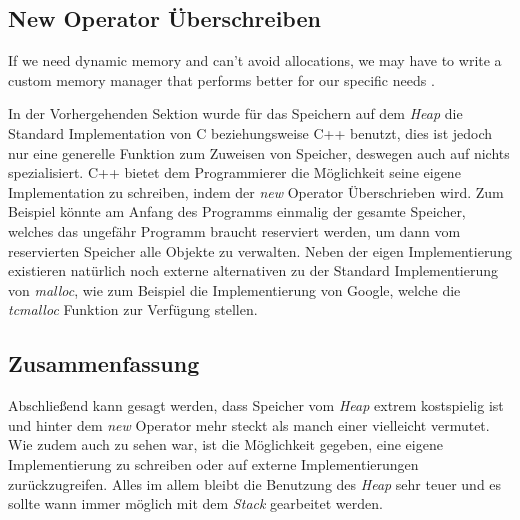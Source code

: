 \subsection{New Operator Überschreiben}
\begin{zitat}
    If we need dynamic memory and can't avoid allocations, we may have to write a custom memory
    manager that performs better for our specific needs \cite{C++HighPer2}.
\end{zitat}
In der Vorhergehenden Sektion wurde für das Speichern auf dem \emph{Heap} die Standard Implementation von C
beziehungsweise C++ benutzt, dies ist jedoch nur eine generelle Funktion zum Zuweisen von
Speicher, deswegen auch auf nichts spezialisiert. C++ bietet dem Programmierer die Möglichkeit
seine eigene Implementation zu schreiben, indem der \emph{new} Operator Überschrieben wird. Zum
Beispiel könnte am Anfang des Programms einmalig der gesamte Speicher, welches das ungefähr
Programm braucht reserviert werden, um dann vom reservierten Speicher alle Objekte zu verwalten.
\newline
\newline
Neben der eigen Implementierung existieren natürlich noch externe alternativen zu der Standard
Implementierung von \emph{malloc}, wie zum Beispiel die Implementierung von Google, welche die
\emph{tcmalloc} Funktion zur Verfügung stellen.

\subsection{Zusammenfassung}
Abschließend kann gesagt werden, dass Speicher vom \emph{Heap} extrem kostspielig ist und hinter
dem \emph{new} Operator mehr steckt als manch einer vielleicht vermutet. Wie zudem auch zu sehen
war, ist die Möglichkeit gegeben, eine eigene Implementierung zu schreiben oder auf externe
Implementierungen zurückzugreifen. Alles im allem bleibt die Benutzung des \emph{Heap} sehr teuer
und es sollte wann immer möglich mit dem \emph{Stack} gearbeitet werden.